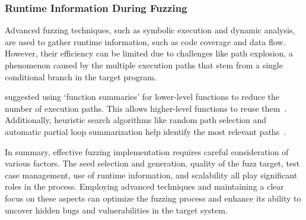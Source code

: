 \subsubsection{Runtime Information During Fuzzing}
Advanced fuzzing techniques, such as symbolic execution and dynamic analysis,
are used to gather runtime information, such as code coverage and data flow.
However, their efficiency can be limited due to challenges like path explosion,
a phenomenon caused by the multiple execution paths that stem from a single
conditional branch in the target program.

 suggested using `function summaries'
for lower-level functions to reduce the number of execution paths. This allows
higher-level functions to reuse them~\cite{godefroid2007compositional}. Additionally,
heuristic search algorithms like random path selection and automatic partial
loop summarization help identify the most relevant paths~\cite{liang2018fuzzing}.

In summary, effective fuzzing implementation requires careful consideration of
various factors. The seed selection and generation, quality of the fuzz target,
test case management, use of runtime information, and scalability all play
significant roles in the process. Employing advanced techniques and maintaining
a clear focus on these aspects can optimize the fuzzing process and enhance its
ability to uncover hidden bugs and vulnerabilities in the target system.
\clearpage